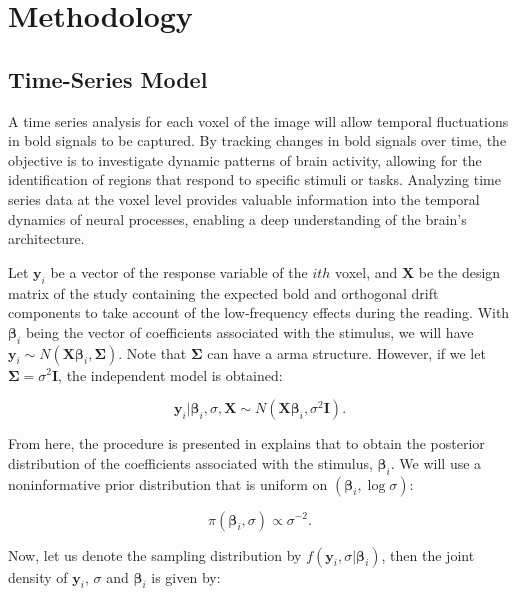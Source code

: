 \chapter{Methodology}

\section{Time-Series Model}

A time series analysis for each voxel of the image will allow temporal fluctuations in \gls{bold} signals to be captured. By tracking changes in \gls{bold} signals over time, the objective is to investigate dynamic patterns of brain activity, allowing for the identification of regions that respond to specific stimuli or tasks. Analyzing time series data at the voxel level provides valuable information into the temporal dynamics of neural processes, enabling a deep understanding of the brain's architecture.

Let $\bm{y}_i$ be a vector of the response variable of the $ith$ voxel, and $\bm{X}$ be the design matrix of the study containing the expected \gls{bold} and orthogonal drift components to take account of the low-frequency effects during the reading. With $\bm{\beta}_i$ being the vector of coefficients associated with the stimulus, we will have $\bm{y}_i \sim N ( \bm{X} \bm{\beta}_i, \bm{\Sigma})$. Note that $\bm{\Sigma}$ can have a \gls{arma} structure. However, if we let $\bm{\Sigma}=\sigma^2 \bm{I}$, the independent model is obtained: 

\begin{equation}
\bm{y}_i|\bm{\beta}_i, \sigma, \bm{X} \sim N \left(\bm{X} \bm{\beta}_i,\sigma^2 \bm{I}\right).
\end{equation}

From here, the procedure is presented in \cite{gelman2013bayesian} explains that to obtain the posterior distribution of the coefficients associated with the stimulus, $\bm{\beta}_i$. We will use a noninformative prior distribution that is uniform on $(\bm{\beta}_i,\log \sigma)$:

\begin{equation}
\pi \left( \bm{\beta}_i, \sigma \right) \propto \sigma^{-2}.
\end{equation}

Now, let us denote the sampling distribution by $f(\bm{y}_i,\sigma|\bm{\beta}_i)$, then the joint density of $\bm{y}_i$, $\sigma$ and $\bm{\beta}_i$ is given by:

